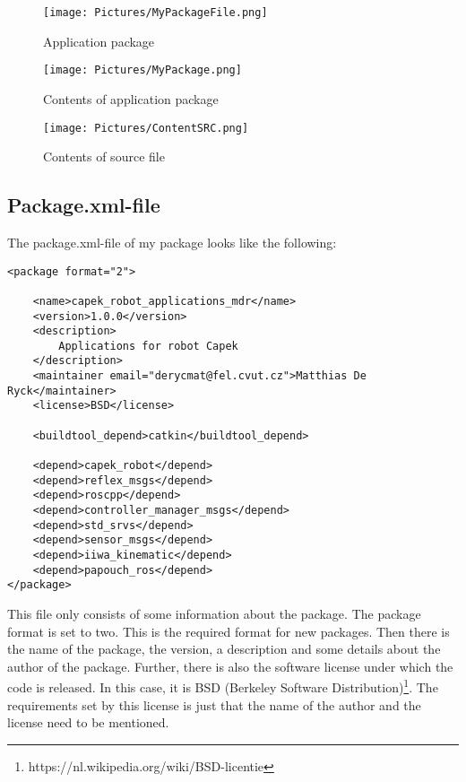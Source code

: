 \documentclass[11pt,a4paper]{report}
\begin{document}
\begin{figure}[!ht]
	\centering
	\texttt{[image: Pictures/MyPackageFile.png]}
	\caption{Application package}
	\label{fig:ApplicationPackageFile}
\end{figure}

\begin{figure}[!ht]
	\centering
	\texttt{[image: Pictures/MyPackage.png]}
	\caption{Contents of application package}
	\label{fig:ApplicationPackage}
\end{figure}

\begin{figure}[!ht]
	\centering
	\texttt{[image: Pictures/ContentSRC.png]}
	\caption{Contents of source file}
	\label{fig:ContentSRC}
\end{figure}
\newpage

\subsection{Package.xml-file}
The package.xml-file of my package looks like the following:
\begin{verbatim}
<package format="2">

    <name>capek_robot_applications_mdr</name>
    <version>1.0.0</version>
    <description>
        Applications for robot Capek
    </description>
    <maintainer email="derycmat@fel.cvut.cz">Matthias De Ryck</maintainer>
    <license>BSD</license>

    <buildtool_depend>catkin</buildtool_depend>

    <depend>capek_robot</depend>
    <depend>reflex_msgs</depend>
    <depend>roscpp</depend>
    <depend>controller_manager_msgs</depend>
    <depend>std_srvs</depend>
    <depend>sensor_msgs</depend>
    <depend>iiwa_kinematic</depend>
    <depend>papouch_ros</depend>
</package>
\end{verbatim}
This file only consists of some information about the package. The package format is set to two. This is the required format for new packages. Then there is the name of the package, the version, a description and some details about the author of the package. Further, there is also the software license under which the code is released. In this case, it is BSD (Berkeley Software Distribution)\footnote{https://nl.wikipedia.org/wiki/BSD-licentie}. The requirements set by this license is just that the name of the author and the license need to be mentioned.
\end{document}
